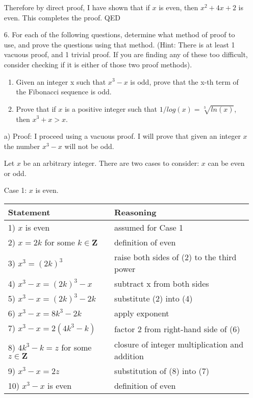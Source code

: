 \begin{enumerate}
\begin{solution}
    Therefore by direct proof, I have shown that if $x$ is even, then $x^2 + 4x + 2$ is even. This completes the proof. QED
    
    \end{solution}




    
    \item[6.] For each of the following questions, determine what method of proof to use, and prove the questions using that method. (Hint: There is at least 1 vacuous proof, and 1 trivial proof. If you are finding any of these too difficult, consider checking if it is either of those two proof methods).
    \begin{enumerate}
    \item Given an integer x such that $x^3 - x$ is odd, prove that the x-th term of the Fibonacci sequence is odd.
    \item Prove that if $x$ is a positive integer such that $1/log(x) = \sqrt[3]{ln(x)}$, then $x^3 +x > x$.
    \end{enumerate}
    \begin{solution}
    
    a) Proof: I proceed using a vacuous proof. I will prove that given an integer $x$ the number $x^3 - x$ will not be odd.
    
    Let $x$ be an arbitrary integer. There are two cases to consider: $x$ can be even or odd.

    Case 1: $x$ is even.
    
    \begin{tabular}{l|l}
    Statement & Reasoning \\ \hline
    1) $x$ is even & assumed for Case 1\\
    2) $x = 2k$ for some $k \in \mathbf{Z}$ & definition of even\\
    3) $x^3 = (2k)^3$ & raise both sides of (2) to the third power\\
    4) $x^3 - x = (2k)^3 - x$ & subtract x from both sides\\
    5) $x^3 - x = (2k)^3 - 2k$ & substitute (2) into (4)\\
    6) $x^3 - x = 8k^3 - 2k$ & apply exponent\\
    7) $x^3 - x = 2(4k^3 - k)$ & factor 2 from right-hand side of (6)\\
    8) $4k^3 - k = z$ for some $z \in \mathbf{Z}$ & closure of integer multiplication and addition\\
    9) $x^3 - x = 2z$ & substitution of (8) into (7)\\
    10) $x^3 - x$ is even & definition of even
    \end{tabular}
    

\end{solution}
\end{enumerate}
